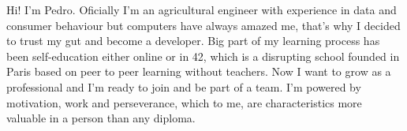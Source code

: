 
\begin{cvparagraph}
  Hi! I'm Pedro. Oficially I'm an agricultural engineer with experience in data and consumer behaviour but computers have always amazed me, that's why I decided to trust my gut and become a developer.
  Big part of my learning process has been self-education either online or in 42, which is a disrupting school founded in Paris based on peer to peer learning without teachers.
  Now I want to grow as a professional and I'm ready to join and be part of a team.
  I'm powered by motivation, work and perseverance, which to me, are characteristics more valuable in a person than any diploma.
\end{cvparagraph}
